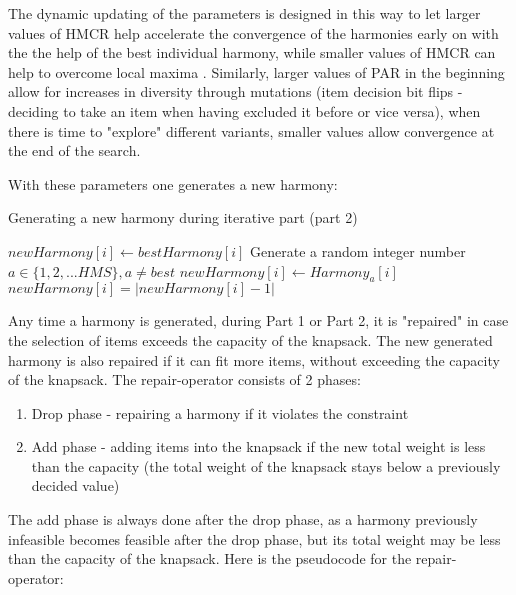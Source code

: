 \documentclass[titlepage]{article}
\begin{document}
The dynamic updating of the parameters is designed in this way to let larger values of HMCR help accelerate the convergence of the harmonies early on with the the help of the best individual harmony, while smaller values of HMCR can help to overcome local maxima \cite{DGHS-article}. Similarly, larger values of PAR in the beginning allow for increases in diversity through mutations (item decision bit flips - deciding to take an item when having excluded it before or vice versa), when there is time to "explore" different variants, smaller values allow convergence at the end of the search. 


With these parameters one generates a new harmony:

\begin{breakablealgorithm}
\caption{Generating a new harmony during iterative part (part 2)}\label{harmonyGen}
    \begin{algorithmic}[1]
                \State $newHarmony[i] \gets bestHarmony[i]$ 
            \Else
                \State Generate a random integer number $a \in \{1, 2, ... HMS\}, a \neq best$
                \State $newHarmony[i] \gets Harmony_{a}[i]$ 
                    \State $newHarmony[i] = |newHarmony[i]-1|$ \Comment{\textcolor{blue}{Flipping i'th item - mutation}}
                \EndIf
            \EndIf
        \EndFor
    \end{algorithmic}
\end{breakablealgorithm}
\vskip 0.5cm


Any time a harmony is generated, during Part 1 or Part 2, it is "repaired" in case the selection of items exceeds the capacity of the knapsack. The new generated harmony is also repaired if it can fit more items, without exceeding the capacity of the knapsack. The repair-operator consists of 2 phases:
\begin{enumerate}
    \item Drop phase - repairing a harmony if it violates the constraint
    \item Add phase - adding items into the knapsack if the new total weight is less than the capacity (the total weight of the knapsack stays below a previously decided value)
\end{enumerate}

The add phase is always done after the drop phase, as a harmony previously infeasible becomes feasible after the drop phase, but its total weight may be less than the capacity of the knapsack. Here is the pseudocode for the repair-operator:
\end{document}
